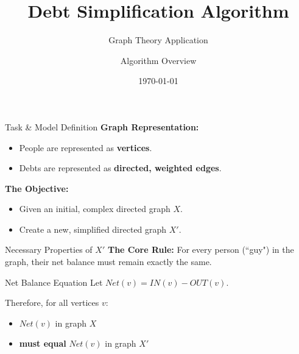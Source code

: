 \documentclass{beamer}
\title{Debt Simplification Algorithm}
\subtitle{Graph Theory Application}
\author{Algorithm Overview}
\date{\today}
\begin{document}
\begin{frame}
    \titlepage
\end{frame}

\begin{frame}{Task \& Model Definition}
    \textbf{Graph Representation:}
    \begin{itemize}
        \item People are represented as \textbf{vertices}.
        \item Debts are represented as \textbf{directed, weighted edges}.
    \end{itemize}

    \vspace{0.5cm}
    \textbf{The Objective:}
    \begin{itemize}
        \item Given an initial, complex directed graph $X$.
        \item Create a new, simplified directed graph $X'$.
    \end{itemize}
\end{frame}

\begin{frame}{Necessary Properties of $X'$}
    \textbf{The Core Rule:}
    For every person (``guy") in the graph, their net balance must remain exactly the same.

    \vspace{0.5cm}
    \begin{block}{Net Balance Equation}
        Let $Net(v) = IN(v) - OUT(v)$.
    \end{block}

    \vspace{0.3cm}
    Therefore, for all vertices $v$:
    \begin{itemize}
        \item $Net(v)$ in graph $X$
        \item \textbf{must equal} $Net(v)$ in graph $X'$
    \end{itemize}
\end{frame}
\end{document}
